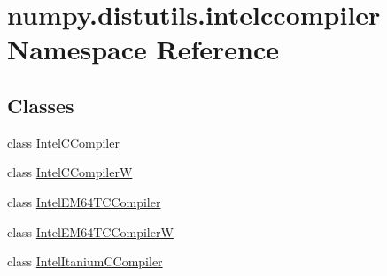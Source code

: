 \hypertarget{namespacenumpy_1_1distutils_1_1intelccompiler}{}\section{numpy.\+distutils.\+intelccompiler Namespace Reference}
\label{namespacenumpy_1_1distutils_1_1intelccompiler}
\subsection*{Classes}
\begin{DoxyCompactItemize}
\item 
class \hyperlink{classnumpy_1_1distutils_1_1intelccompiler_1_1IntelCCompiler}{Intel\+C\+Compiler}
\item 
class \hyperlink{classnumpy_1_1distutils_1_1intelccompiler_1_1IntelCCompilerW}{Intel\+C\+CompilerW}
\item 
class \hyperlink{classnumpy_1_1distutils_1_1intelccompiler_1_1IntelEM64TCCompiler}{Intel\+E\+M64\+T\+C\+Compiler}
\item 
class \hyperlink{classnumpy_1_1distutils_1_1intelccompiler_1_1IntelEM64TCCompilerW}{Intel\+E\+M64\+T\+C\+CompilerW}
\item 
class \hyperlink{classnumpy_1_1distutils_1_1intelccompiler_1_1IntelItaniumCCompiler}{Intel\+Itanium\+C\+Compiler}
\end{DoxyCompactItemize}
